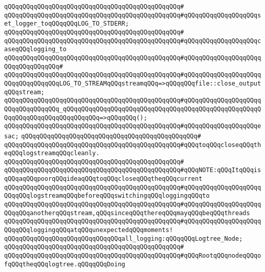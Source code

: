 \verb|qQQqqQQqqQQqqQQqqQQqqQQqqQQqqQQqqQQqqQQqqQQqqQQq#|\newline
\verb|qQQqqQQqqQQqqQQqqQQqqQQqqQQqqQQqqQQqqQQqqQQqqQQq#qQQqqQQqqQQqqQQqqQQqset_logger_toqQQqqQQqLOG_TO_STDERR;|\newline
\verb|qQQqqQQqqQQqqQQqqQQqqQQqqQQqqQQqqQQqqQQqqQQqqQQq#|\newline
\verb|qQQqqQQqqQQqqQQqqQQqqQQqqQQqqQQqqQQqqQQqqQQqqQQq#qQQqqQQqqQQqqQQqqQQqcaseqQQqlogging_to|\newline
\verb|qQQqqQQqqQQqqQQqqQQqqQQqqQQqqQQqqQQqqQQqqQQqqQQq#qQQqqQQqqQQqqQQqqQQqqQQqqQQqqQQqqQQq#|\newline
\verb|qQQqqQQqqQQqqQQqqQQqqQQqqQQqqQQqqQQqqQQqqQQqqQQq#qQQqqQQqqQQqqQQqqQQqqQQqqQQqqQQqqQQqLOG_TO_STREAMqQQqstreamqQQq=>qQQqqQQqfile::close_outputqQQqstream;|\newline
\verb|qQQqqQQqqQQqqQQqqQQqqQQqqQQqqQQqqQQqqQQqqQQqqQQq#qQQqqQQqqQQqqQQqqQQqqQQqqQQqqQQqqQQq_qQQqqQQqqQQqqQQqqQQqqQQqqQQqqQQqqQQqqQQqqQQqqQQqqQQqqQQqqQQqqQQqqQQqqQQqqQQqqQQq=>qQQqqQQq();|\newline
\verb|qQQqqQQqqQQqqQQqqQQqqQQqqQQqqQQqqQQqqQQqqQQqqQQq#qQQqqQQqqQQqqQQqqQQqesac;|\newline
\verb|qQQqqQQqqQQqqQQqqQQqqQQqqQQqqQQqqQQqqQQqqQQqqQQq#|\newline
\verb|qQQqqQQqqQQqqQQqqQQqqQQqqQQqqQQqqQQqqQQqqQQqqQQq#qQQqtoqQQqcloseqQQqtheqQQqlogstreamqQQqcleanly.|\newline
\verb|qQQqqQQqqQQqqQQqqQQqqQQqqQQqqQQqqQQqqQQqqQQqqQQq#|\newline
\verb|qQQqqQQqqQQqqQQqqQQqqQQqqQQqqQQqqQQqqQQqqQQqqQQq#qQQqNOTE:qQQqItqQQqisqQQqaqQQqpoorqQQqideaqQQqtoqQQqcloseqQQqtheqQQqcurrent|\newline
\verb|qQQqqQQqqQQqqQQqqQQqqQQqqQQqqQQqqQQqqQQqqQQqqQQq#qQQqqQQqqQQqqQQqqQQqqQQqqQQqlogstreamqQQqbeforeqQQqswitchingqQQqloggingqQQqto|\newline
\verb|qQQqqQQqqQQqqQQqqQQqqQQqqQQqqQQqqQQqqQQqqQQqqQQq#qQQqqQQqqQQqqQQqqQQqqQQqqQQqanotherqQQqstream,qQQqsinceqQQqthereqQQqmayqQQqbeqQQqthreads|\newline
\verb|qQQqqQQqqQQqqQQqqQQqqQQqqQQqqQQqqQQqqQQqqQQqqQQq#qQQqqQQqqQQqqQQqqQQqqQQqqQQqloggingqQQqatqQQqunexpectedqQQqmoments!|\newline
\newline
\verb|qQQqqQQqqQQqqQQqqQQqqQQqqQQqqQQqall_logging:qQQqqQQqLogtree_Node;|\newline
\verb|qQQqqQQqqQQqqQQqqQQqqQQqqQQqqQQqqQQqqQQqqQQqqQQq#|\newline
\verb|qQQqqQQqqQQqqQQqqQQqqQQqqQQqqQQqqQQqqQQqqQQqqQQq#qQQqRootqQQqnodeqQQqofqQQqtheqQQqlogtree.qQQqqQQqDoing|\newline
